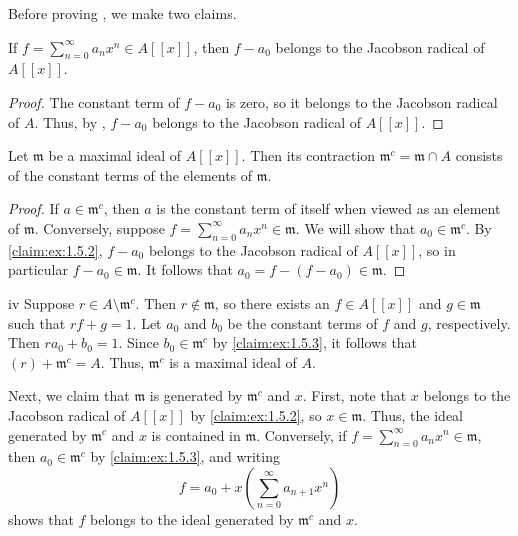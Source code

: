 Before proving , we make two claims.

\begin{claim}
\label{claim:ex:1.5.2}
If \(f = \sum_{n=0}^\infty a_n x^n \in A[[x]]\), then \(f - a_0\) belongs to the Jacobson radical of \(A[[x]]\).
\end{claim}

\begin{proof}
The constant term of \(f - a_0\) is zero, so it belongs to the Jacobson radical of \(A\).
Thus, by , \(f - a_0\) belongs to the Jacobson radical of \(A[[x]]\).
\end{proof}

\begin{claim}
\label{claim:ex:1.5.3}
Let \(\mathfrak{m}\) be a maximal ideal of \(A[[x]]\).
Then its contraction \(\mathfrak{m}^c = \mathfrak{m} \cap A\) consists of the constant terms of the elements of \(\mathfrak{m}\).
\end{claim}

\begin{proof}
If \(a \in \mathfrak{m}^c\), then \(a\) is the constant term of itself when viewed as an element of \(\mathfrak{m}\).
Conversely, suppose \(f = \sum_{n=0}^\infty a_n x^n \in \mathfrak{m}\).
We will show that \(a_0 \in \mathfrak{m}^c\).
By \autoref{claim:ex:1.5.2}, \(f - a_0\) belongs to the Jacobson radical of \(A[[x]]\), so in particular \(f - a_0 \in \mathfrak{m}\).
It follows that \(a_0 = f - (f - a_0) \in \mathfrak{m}\).
\end{proof}

\begin{partsolution}{iv}
Suppose \(r \in A \setminus \mathfrak{m}^c\).
Then \(r \notin \mathfrak{m}\), so there exists an \(f \in A[[x]]\) and \(g \in \mathfrak{m}\) such that \(r f + g = 1\).
Let \(a_0\) and \(b_0\) be the constant terms of \(f\) and \(g\), respectively.
Then \(r a_0 + b_0 = 1\).
Since \(b_0 \in \mathfrak{m}^c\) by \autoref{claim:ex:1.5.3}, it follows that \((r) + \mathfrak{m}^c = A\).
Thus, \(\mathfrak{m}^c\) is a maximal ideal of \(A\).

Next, we claim that \(\mathfrak{m}\) is generated by \(\mathfrak{m}^c\) and \(x\).
First, note that \(x\) belongs to the Jacobson radical of \(A[[x]]\) by \autoref{claim:ex:1.5.2}, so \(x \in \mathfrak{m}\).
Thus, the ideal generated by \(\mathfrak{m}^c\) and \(x\) is contained in \(\mathfrak{m}\).
Conversely, if \(f = \sum_{n=0}^\infty a_n x^n \in \mathfrak{m}\), then \(a_0 \in \mathfrak{m}^c\) by \autoref{claim:ex:1.5.3}, and writing
\begin{equation*}
f = a_0 + x \left(\sum_{n=0}^\infty a_{n+1} x^n\right)
\end{equation*}
shows that \(f\) belongs to the ideal generated by \(\mathfrak{m}^c\) and \(x\).
\end{partsolution}

